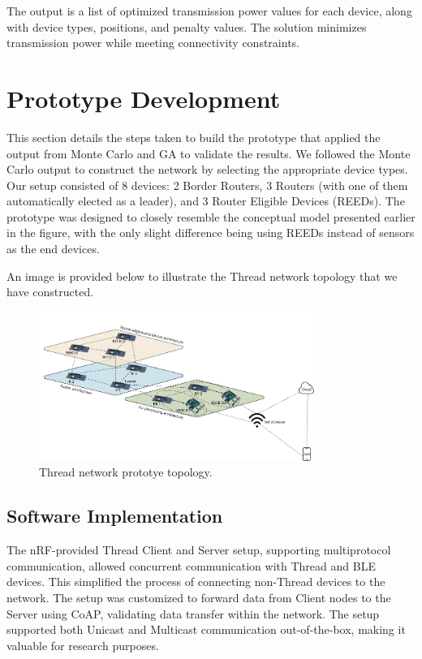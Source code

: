 The output is a list of optimized transmission power values for each device, along with device types, positions, and penalty values. The solution minimizes transmission power while meeting connectivity constraints.


\section{Prototype Development}\label{sec:prototype_development}
This section details the steps taken to build the prototype that applied the output from Monte Carlo and GA to validate the results. We followed the Monte Carlo output to construct the network by selecting the appropriate device types. Our setup consisted of 8 devices: 2 Border Routers, 3 Routers (with one of them automatically elected as a leader), and 3 Router Eligible Devices (REEDs). The prototype was designed to closely resemble the conceptual model presented earlier in the figure, with the only slight difference being using REEDs instead of sensors as the end devices.

An image is provided below to illustrate the Thread network topology that we have constructed.

\begin{figure}[h]
    \centering
    \includegraphics[width=0.8\textwidth]{images/research_design/prototype_topology.png}
    \caption{Thread network prototye topology.}
    \label{fig:prototype_topology}
\end{figure}

\subsection{Software Implementation}\label{sec:software_implementation}
The nRF-provided Thread Client and Server setup, supporting multiprotocol communication, allowed concurrent communication with Thread and BLE devices. This simplified the process of connecting non-Thread devices to the network. The setup was customized to forward data from Client nodes to the Server using CoAP, validating data transfer within the network. The setup supported both Unicast and Multicast communication out-of-the-box, making it valuable for research purposes.

